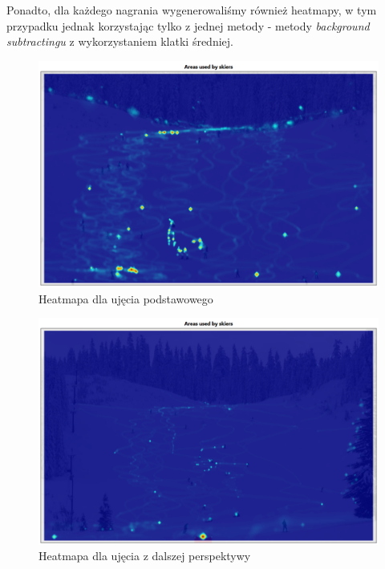 \documentclass[a4paper]{article}
\begin{document}
Ponadto, dla każdego nagrania wygenerowaliśmy również heatmapy, w tym przypadku jednak korzystając tylko z jednej metody - metody \textit{background subtractingu} z wykorzystaniem klatki średniej.
\begin{figure}[H]
  \includegraphics[width=\linewidth]{resources/img11.png}
  \caption{Heatmapa dla ujęcia podstawowego}
\end{figure}
\begin{figure}[H]
  \includegraphics[width=\linewidth]{resources/img12.png}
  \caption{Heatmapa dla ujęcia z dalszej perspektywy}
\end{figure}
\end{document}
